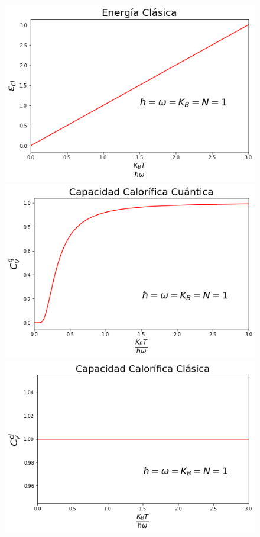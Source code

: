 \documentclass[10pt,a4paper]{article}
\begin{document}
\begin{figure}
\includegraphics[scale=0.5]{ecl.png}
\includegraphics[scale=0.5]{cvq.png}
\includegraphics[scale=0.5]{cvcl.png}
\end{figure}
\end{document}
